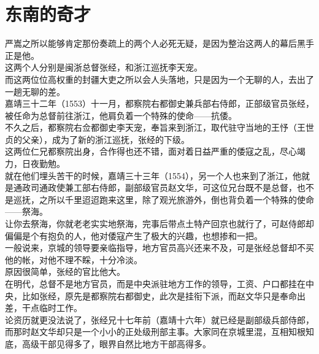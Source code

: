 \section{东南的奇才}
\ifnum{}
	\begin{multicols}{\theparacolNo}
\fi
严嵩之所以能够肯定那份奏疏上的两个人必死无疑，是因为整治这两人的幕后黑手正是他。\\

这两个人分别是闽浙总督张经，和浙江巡抚李天宠。\\

而这两位位高权重的封疆大吏之所以会人头落地，只是因为一个无聊的人，去出了一趟无聊的差。\\

嘉靖三十二年（1553）十一月，都察院右都御史兼兵部右侍郎，正部级官员张经，被任命为总督前往浙江，他肩负着一个特殊的使命——抗倭。\\

不久之后，都察院右佥都御史李天宠，奉旨来到浙江，取代驻守当地的王忬（王世贞的父亲），成为了新的浙江巡抚，张经的下级。\\

这两位仁兄都察院出身，合作得也还不错，面对着日益严重的倭寇之乱，尽心竭力，日夜勤勉。\\

就在他们埋头苦干的时候，嘉靖三十三年（1554），另一个人也来到了浙江，他就是通政司通政使兼工部右侍郎，副部级官员赵文华，可这位兄台既不是总督，也不是巡抚，之所以千里迢迢跑来这里，除了观光旅游外，倒也背负着一个特殊的使命——祭海。\\

让你去祭海，你就老老实实地祭海，完事后带点土特产回京也就行了，可赵侍郎却偏偏是个有抱负的人，他对倭寇产生了极大的兴趣，也想掺和一把。\\

一般说来，京城的领导要亲临指导，地方官员高兴还来不及，可是张经总督却不买他的帐，对他不理不睬，十分冷淡。\\

原因很简单，张经的官比他大。\\

在明代，总督不是地方官员，而是中央派驻地方工作的领导，工资、户口都挂在中央，比如张经，原先是都察院右都御史，此次是挂衔下派，而赵文华只是奉命出差，干点临时工作。\\

论资历就更没法说了，张经兄十七年前（嘉靖十六年）就已经是副部级兵部侍郎，而那时赵文华却只是一个小小的正处级刑部主事。大家同在京城里混，互相知根知底，高级干部见得多了，眼界自然比地方干部高得多。\\


\end{multicols}
